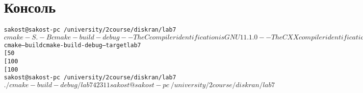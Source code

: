 \section{Консоль}
\begin{alltt}
	sakost@sakost-pc ~/university/2 course/diskran/lab7
	$ cmake -S . -B cmake-build-debug
	-- The C compiler identification is GNU 11.1.0
	-- The CXX compiler identification is GNU 11.1.0
	-- Detecting C compiler ABI info
	-- Detecting C compiler ABI info - done
	-- Check for working C compiler: /sbin/cc - skipped
	-- Detecting C compile features
	-- Detecting C compile features - done
	-- Detecting CXX compiler ABI info
	-- Detecting CXX compiler ABI info - done
	-- Check for working CXX compiler: /sbin/c++ - skipped
	-- Detecting CXX compile features
	-- Detecting CXX compile features - done
	-- Configuring done
	-- Generating done
	-- Build files have been written to: /home/sakost/university/2 course/diskran/lab7/cmake-build-debug
	sakost@sakost-pc ~/university/2 course/diskran/lab7
	$ cmake --build cmake-build-debug --target lab7
	[ 50%] Building CXX object CMakeFiles/lab7.dir/main.cpp.o
	[100%] Linking CXX executable lab7
	[100%] Built target lab7
	sakost@sakost-pc ~/university/2 course/diskran/lab7
	$ ./cmake-build-debug/lab7
	42 3
	11
	sakost@sakost-pc ~/university/2 course/diskran/lab7
	$


	
\end{alltt}
\pagebreak


